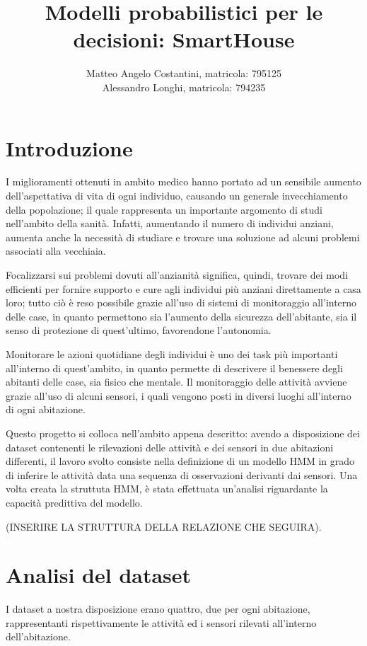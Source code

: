 \documentclass[10pt,a4paper]{article}
\title{Modelli probabilistici per le decisioni: SmartHouse}
\author{Matteo Angelo Costantini, matricola: 795125 \\
	Alessandro Longhi, matricola: 794235}
\date{}
\begin{document}
	\maketitle
	\clearpage
	\tableofcontents
	\clearpage
	\section{Introduzione}
	I miglioramenti ottenuti in ambito medico hanno portato ad un sensibile aumento dell'aspettativa di vita di ogni individuo, causando un generale invecchiamento della popolazione; il quale rappresenta un importante argomento di studi nell'ambito della sanità. Infatti, aumentando il numero di individui anziani, aumenta anche la necessità di studiare e trovare una soluzione ad alcuni problemi associati alla vecchiaia.
	
	Focalizzarsi sui problemi dovuti all'anzianità significa, quindi, trovare dei modi efficienti per fornire supporto e cure agli individui più anziani direttamente a casa loro; tutto ciò è reso possibile grazie all'uso di sistemi di monitoraggio all'interno delle case, in quanto permettono sia l'aumento della sicurezza dell'abitante, sia il senso di protezione di quest'ultimo, favorendone l'autonomia.
	
	Monitorare le azioni quotidiane degli individui è uno dei task più importanti all'interno di quest'ambito, in quanto permette di descrivere il benessere degli abitanti delle case, sia fisico che mentale. Il monitoraggio delle attività avviene grazie all'uso di alcuni sensori, i quali vengono posti in diversi luoghi all'interno di ogni abitazione. 
	
	Questo progetto si colloca nell'ambito appena descritto: avendo a disposizione dei dataset contenenti le rilevazioni delle attività e dei sensori in due abitazioni differenti, il lavoro svolto consiste nella definizione di un modello HMM in grado di inferire le attività data una sequenza di osservazioni derivanti dai sensori. Una volta creata la struttuta HMM, è stata effettuata un'analisi riguardante la capacità predittiva del modello.
	
	(INSERIRE LA STRUTTURA DELLA RELAZIONE CHE SEGUIRA). 
	
	
	\clearpage
	\section{Analisi del dataset}
	I dataset a nostra disposizione erano quattro, due per ogni abitazione, rappresentanti rispettivamente le attività ed i sensori rilevati all'interno dell'abitazione.
	
\end{document}
